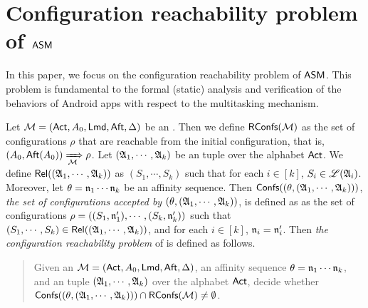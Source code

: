 




\section{Configuration reachability problem of $\textsf{ASM}$}\label{sec-conf-reach}

In this paper, we focus on the configuration reachability problem of $\textsf{ASM}$. This problem is fundamental to the formal (static) analysis and verification of the behaviors of Android apps with respect to the multitasking mechanism.  

Let ${\mathcal{M} } =({\sf Act}, A_0, {\sf Lmd}, {\sf Aft}, \Delta)$ be an  {\AMASS}. Then we define $\mathsf{RConfs}({\mathcal{M} })$ as the set of configurations $\rho$ that are reachable from the initial configuration, that is, 
$(A_0, {\sf Aft}(A_0)) \xRightarrow[{\mathcal{M} }]{} \rho$. 
Let $({\mathfrak{A} }_1,\cdots,{\mathfrak{A} }_k)$ be an {\NFA} tuple over the alphabet ${\sf Act}$. We define $\mathsf{Rel}(({\mathfrak{A} }_1, \cdots, {\mathfrak{A} }_k))$ as $(S_1, \cdots, S_k)$ such that for each $i \in [k]$, $S_i \in {\mathscr{L} }({\mathfrak{A} }_i)$. Moreover, let $\theta = \mathfrak{n}_1\cdots\mathfrak{n}_k$ be an affinity sequence. Then ${\mathsf{Confs} }((\theta, ({\mathfrak{A} }_1,\cdots,{\mathfrak{A} }_k)))$, \emph{the set of configurations accepted by $(\theta, ({\mathfrak{A} }_1,\cdots,{\mathfrak{A} }_k))$}, is defined as as the set of configurations $\rho = ((S_1,\mathfrak{n}'_1),\cdots,(S_k,\mathfrak{n}'_k))$  such that $(S_1, \cdots, S_k) \in \mathsf{Rel}(({\mathfrak{A} }_1, \cdots, {\mathfrak{A} }_k))$, and for each $i \in [k]$, $\mathfrak{n}_i=\mathfrak{n}_i'$.
%
Then \emph{the configuration reachability problem} of {\AMASS} is defined as follows. 
\begin{quote}
Given an {\AMASS} ${\mathcal{M} }= ({\sf Act}, A_0, {\sf Lmd}, {\sf Aft}, \Delta)$, an affinity sequence $\theta = \mathfrak{n}_1\cdots\mathfrak{n}_k$, and an {\NFA} tuple $({\mathfrak{A} }_1,\cdots,{\mathfrak{A} }_k)$ over the alphabet ${\sf Act}$, decide whether $ {\mathsf{Confs} }({(\theta, ({\mathfrak{A} }_1,\cdots,{\mathfrak{A} }_k))}) \cap \mathsf{RConfs}({\mathcal{M} }) \neq \emptyset$.
\end{quote}

